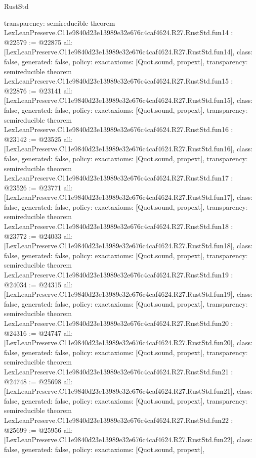 \begin{lexlean}{RustStd}
\begin{coremodule}
{  transparency: semireducible
}
theorem LexLeanPreserve.C11e9840d23e13989e32e676c4caf4624.R27.RustStd.fun14 : @22579 := @22875 {
  all: [LexLeanPreserve.C11e9840d23e13989e32e676c4caf4624.R27.RustStd.fun14],
  class: false,
  generated: false,
  policy: exact{axioms: [Quot.sound, propext]},
  transparency: semireducible
}
theorem LexLeanPreserve.C11e9840d23e13989e32e676c4caf4624.R27.RustStd.fun15 : @22876 := @23141 {
  all: [LexLeanPreserve.C11e9840d23e13989e32e676c4caf4624.R27.RustStd.fun15],
  class: false,
  generated: false,
  policy: exact{axioms: [Quot.sound, propext]},
  transparency: semireducible
}
theorem LexLeanPreserve.C11e9840d23e13989e32e676c4caf4624.R27.RustStd.fun16 : @23142 := @23525 {
  all: [LexLeanPreserve.C11e9840d23e13989e32e676c4caf4624.R27.RustStd.fun16],
  class: false,
  generated: false,
  policy: exact{axioms: [Quot.sound, propext]},
  transparency: semireducible
}
theorem LexLeanPreserve.C11e9840d23e13989e32e676c4caf4624.R27.RustStd.fun17 : @23526 := @23771 {
  all: [LexLeanPreserve.C11e9840d23e13989e32e676c4caf4624.R27.RustStd.fun17],
  class: false,
  generated: false,
  policy: exact{axioms: [Quot.sound, propext]},
  transparency: semireducible
}
theorem LexLeanPreserve.C11e9840d23e13989e32e676c4caf4624.R27.RustStd.fun18 : @23772 := @24033 {
  all: [LexLeanPreserve.C11e9840d23e13989e32e676c4caf4624.R27.RustStd.fun18],
  class: false,
  generated: false,
  policy: exact{axioms: [Quot.sound, propext]},
  transparency: semireducible
}
theorem LexLeanPreserve.C11e9840d23e13989e32e676c4caf4624.R27.RustStd.fun19 : @24034 := @24315 {
  all: [LexLeanPreserve.C11e9840d23e13989e32e676c4caf4624.R27.RustStd.fun19],
  class: false,
  generated: false,
  policy: exact{axioms: [Quot.sound, propext]},
  transparency: semireducible
}
theorem LexLeanPreserve.C11e9840d23e13989e32e676c4caf4624.R27.RustStd.fun20 : @24316 := @24747 {
  all: [LexLeanPreserve.C11e9840d23e13989e32e676c4caf4624.R27.RustStd.fun20],
  class: false,
  generated: false,
  policy: exact{axioms: [Quot.sound, propext]},
  transparency: semireducible
}
theorem LexLeanPreserve.C11e9840d23e13989e32e676c4caf4624.R27.RustStd.fun21 : @24748 := @25698 {
  all: [LexLeanPreserve.C11e9840d23e13989e32e676c4caf4624.R27.RustStd.fun21],
  class: false,
  generated: false,
  policy: exact{axioms: [Quot.sound, propext]},
  transparency: semireducible
}
theorem LexLeanPreserve.C11e9840d23e13989e32e676c4caf4624.R27.RustStd.fun22 : @25699 := @25956 {
  all: [LexLeanPreserve.C11e9840d23e13989e32e676c4caf4624.R27.RustStd.fun22],
  class: false,
  generated: false,
  policy: exact{axioms: [Quot.sound, propext]},
}
\end{coremodule}
\end{lexlean}
